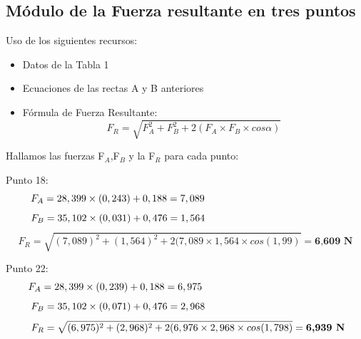 \documentclass[10pt]{article}
\begin{document}
\newpage
\hspace{1cm}


\subsection{Módulo de la Fuerza resultante en tres puntos}\vspace{2mm}

Uso de los siguientes recursos:
\begin{itemize}
    \item Datos de la Tabla 1
    \item Ecuaciones de las rectas A y B anteriores
    \item Fórmula de Fuerza Resultante:
    \large{\begin{equation}
        F_{R} = \sqrt{F^{2}_{A} + F^{2}_{B} + 2(F_{A} \times F_{B} \times cos \alpha)}
    \end{equation}}
\end{itemize}

\vspace{0,2cm}
Hallamos las fuerzas F$_{A}$,F$_{B}$ y la F$_{R}$  para cada punto:

Punto 18:
 \begin{equation*}
    F_{A} = 28,399 \times (0,243) + 0,188 = 7,089
    \textcolor{Blanco}{--------------}
\end{equation*}
\begin{equation*}
    F_{B} = 35,102 \times (0,031) + 0,476 = 1,564
    \textcolor{Blanco}{--------------}
\end{equation*}  
\begin{equation*}
    F_{R} = \sqrt{(7,089)^{2} + (1,564)^{2} + 2(7,089 \times 1,564 \times cos(1,99)} = \textbf{6,609 N}
\end{equation*}
\vspace{-0,2cm}

Punto 22:
 \begin{equation*}
    F_{A} = 28,399 \times (0,239) + 0,188 = 6,975
    \textcolor{Blanco}{-------------..-}
\end{equation*}
\begin{equation*}
    F_{B} = 35,102 \times (0,071) + 0,476 = 2,968
    \textcolor{Blanco}{--------------}
\end{equation*}  
\begin{equation*}
   \textcolor{Blanco}{..} 
    F_{R} = \sqrt{(6,975)^{2} + (2,968)^{2} + 2(6,976 \times 2,968 \times cos(1,798)} = \textbf{6,939 N}
\end{equation*}
\end{document}
